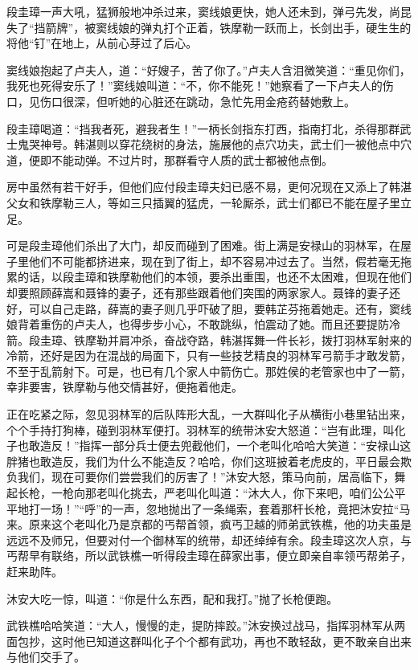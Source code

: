 \documentclass[12pt,oneside]{book}
\begin{document}
段圭璋一声大吼，猛狮般地冲杀过来，窦线娘更快，她人还未到，弹弓先发，尚昆失了``挡箭牌''，被窦线娘的弹丸打个正着，铁摩勒一跃而上，长剑出手，硬生生的将他``钉''在地上，从前心芽过了后心。

窦线娘抱起了卢夫人，道：``好嫂子，苦了你了。''卢夫人含泪微笑道：``重见你们，我死也死得安乐了！''窦线娘叫道：``不，你不能死！''她察看了一下卢夫人的伤口，见伤口很深，但听她的心脏还在跳动，急忙先用金疮药替她敷上。

段圭璋喝道：``挡我者死，避我者生！''一柄长剑指东打西，指南打北，杀得那群武士鬼哭神号。韩湛则以穿花绕树的身法，施展他的点穴功夫，武士们一被他点中穴道，便即不能动弹。不过片时，那群看守人质的武士都被他点倒。

房中虽然有若干好手，但他们应付段圭璋夫妇已感不易，更何况现在又添上了韩湛父女和铁摩勒三人，等如三只插翼的猛虎，一轮厮杀，武士们都已不能在屋子里立足。

可是段圭璋他们杀出了大门，却反而碰到了困难。街上满是安禄山的羽林军，在屋子里他们不可能都挤进来，现在到了街上，却不容易冲过去了。当然，假若毫无拖累的话，以段圭璋和铁摩勒他们的本领，要杀出重围，也还不太困难，但现在他们却要照顾薛嵩和聂锋的妻子，还有那些跟着他们突围的两家家人。聂锋的妻子还好，可以自己走路，薛嵩的妻子则几乎吓破了胆，要韩芷芬拖着她走。还有，窦线娘背着重伤的卢夫人，也得步步小心，不敢跳纵，怕震动了她。而且还要提防冷箭。段圭璋、铁摩勒并肩冲杀，奋战夺路，韩湛挥舞一件长衫，拨打羽林军射来的冷箭，还好是因为在混战的局面下，只有一些技艺精良的羽林军弓箭手才敢发箭，不至于乱箭射下。可是，也已有几个家人中箭伤亡。那姓侯的老管家也中了一箭，幸非要害，铁摩勒与他交情甚好，便拖着他走。

正在吃紧之际，忽见羽林军的后队阵形大乱，一大群叫化子从横街小巷里钻出来，个个手持打狗棒，碰到羽林军便打。羽林军的统带沐安大怒道：``岂有此理，叫化子也敢造反！''指挥一部分兵士便去兜截他们，一个老叫化哈哈大笑道：``安禄山这胖猪也敢造反，我们为什么不能造反？哈哈，你们这班披着老虎皮的，平日最会欺负我们，现在可要你们尝尝我们的厉害了！''沐安大怒，策马向前，居高临下，舞起长枪，一枪向那老叫化挑去，严老叫化叫道：``沐大人，你下来吧，咱们公公平平地打一场！''``呼''的一声，忽地抛出了一条绳索，套着那杆长枪，竟把沐安拉``马来。原来这个老叫化乃是京都的丐帮首领，疯丐卫越的师弟武铁樵，他的功夫虽是远远不及师兄，但要对付一个御林军的统带，却还绰绰有余。段圭璋这次人京，与丐帮早有联络，所以武铁樵一听得段圭璋在薛家出事，便立即亲自率领丐帮弟子，赶来助阵。

沐安大吃一惊，叫道：``你是什么东西，配和我打。''抛了长枪便跑。

武铁樵哈哈笑道：``大人，慢慢的走，提防摔跤。''沐安换过战马，指挥羽林军从两面包抄，这时他已知道这群叫化子个个都有武功，再也不敢轻敌，更不敢亲自出来与他们交手了。
\end{document}
